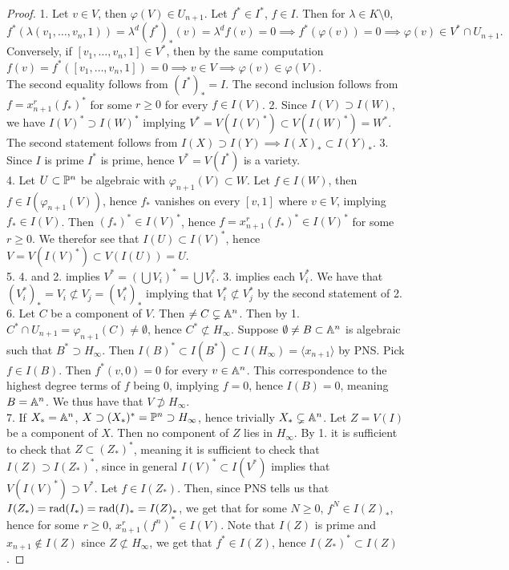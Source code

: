     \begin{proof}
        1. Let $v\in V$, then $\varphi(V)\in U_{n+1}$. Let $f^\ast\in I^\ast$, $f\in I$. Then for $\lambda\in K\setminus 0$,
        $$f^\ast(\lambda(v_1,\dots,v_n,1))=\lambda^d(f^\ast)_\ast(v)=\lambda^d f(v)=0\implies f^\ast(\varphi(v))=0\implies \varphi(v)\in V^\ast\cap U_{n+1}.$$
        Conversely, if $[v_1,\dots,v_n,1]\in V^\ast$, then by the same computation $f(v)=f^\ast([v_1,\dots,v_n,1])=0\implies v\in V\implies \varphi(v)\in \varphi(V).$\\
        The second equality follows from $(I^\ast)_\ast=I$. The second inclusion follows from $f = x_{n+1}^{r}(f_\ast)^\ast$ for some $r\geq 0$ for every $f\in I(V)$. 
        2. Since $I(V)\supset I(W)$, we have $I(V)^\ast \supset I(W)^\ast$ implying $V^\ast = V(I(V)^\ast)\subset V(I(W)^\ast)=W^\ast$. The second statement follows from $I(X)\supset I(Y)\implies I(X)_\ast \subset I(Y)_\ast$.
        3. Since $I$ is prime $I^\ast$ is prime, hence $V^\ast =V(I^\ast)$ is a variety.\\
        4. Let $U\subset \mathbb{P}^n$ be algebraic with $\varphi_{n+1}(V)\subset W$. Let $f\in I(W)$, then $f\in I(\varphi_{n+1}(V))$, hence $f_\ast$ vanishes on every $[v,1]$ where $v\in V$, implying $f_\ast \in I(V)$. Then $(f_\ast)^\ast\in I(V)^\ast$,
        hence $f=x_{n+1}^r(f_\ast)^\ast \in I(V)^\ast$ for some $r\geq 0$. We therefor see that $I(U)\subset I(V)^\ast$, hence $V=V(I(V)^\ast)\subset V(I(U))=U$.\\ 
        5. 4. and 2. implies $V^\ast = \left(\bigcup V_i\right)^\ast = \bigcup V_i^\ast$. 3. implies each $V_i^\ast$. We have that $(V_i^\ast)_\ast=V_i \not\subset V_j = (V_i^\ast)_\ast$ implying that $V_i^\ast \not\subset V_j^\ast$ by the second statement of 2.\\
        6.  Let $C$ be a component of $V$. Then $\neq C \subsetneq \mathbb{A}^n$. Then by 1. $C^\ast \cap U_{n+1} = \varphi_{n+1}(C)\neq \emptyset$, hence $C^\ast\not\subset H_\infty$. Suppose $\emptyset \neq B\subset \mathbb{A}^n$ is algebraic such that $B^\ast \supset H_\infty$. Then $I(B)^\ast \subset I(B^\ast)\subset I(H_\infty)=\langle x_{n+1}\rangle$ by PNS. Pick $f\in I(B)$. Then $f^\ast(v,0)=0$ for every $v\in \mathbb{A}^n$. This correspondence to the highest degree terms of $f$ being $0$, implying $f=0$, hence $I(B)=0$, meaning $B=\mathbb{A}^n$. We thus have that $V\not\supset H_\infty$.\\ 
        7. If $X_\ast = \mathbb{A}^n$, $X\supset (X_\ast)^\ast =\mathbb{P}^n \supset H_\infty$, hence trivially $X_\ast \subsetneq \mathbb{A}^n$. Let $Z=V(I)$ be a component of $X$. Then no component of $Z$ lies in $H_\infty$. By 1. it is sufficient to check that $Z \subset (Z_\ast)^\ast$, meaning it is sufficient to check that $I(Z)\supset I(Z_\ast)^\ast$, since in general $I(V)^\ast \subset I(V^\ast)$ implies that $V(I(V)^\ast)\supset V^\ast$. Let $f\in I(Z_\ast)$. Then, since PNS tells us that $I(Z_\ast)=\mathrm{rad}(I_\ast)=\mathrm{rad}(I)_\ast =I(Z)_\ast$, we get that for some $N\geq 0$, $f^N\in I(Z)_\ast$, hence for some $r\geq0$, $x_{n+1}^r(f^n)^\ast\in I(V)$. Note that $I(Z)$ is prime and $x_{n+1}\notin I(Z)$ since $Z\not\subset H_\infty$, we get that $f^\ast\in I(Z)$, hence $I(Z_\ast)^\ast\subset I(Z)$.
    \end{proof}
